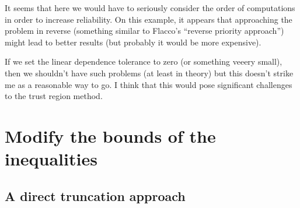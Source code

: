 \documentclass[12pt]{article}
\begin{document}
It seems that here we would have to seriously consider the order of computations in order to
increase reliability. On this example, it appears that approaching the problem in reverse (something
similar to Flacco's ``reverse priority approach'') might lead to better results (but probably it
would be more expensive).

If we set the linear dependence tolerance to zero (or something veeery small), then we shouldn't
have such problems (at least in theory) but this doesn't strike me as a reasonable way to go. I
think that this would pose significant challenges to the trust region method.

\newpage

\section{Modify the bounds of the inequalities}

\subsection{A direct truncation approach}
\end{document}
